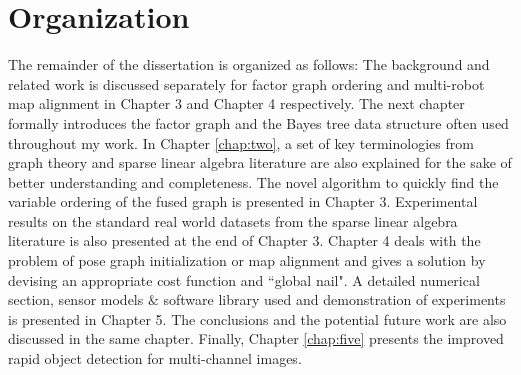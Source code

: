 \section{Organization}
The remainder of the dissertation is organized as follows: The background and related work is discussed separately for factor graph ordering and multi-robot map alignment in Chapter 3 and Chapter 4 respectively. The next chapter formally introduces the factor graph and the Bayes tree data structure often used throughout my work. In Chapter \ref{chap:two}, a set of key terminologies from graph theory and sparse linear algebra literature are also explained for the sake of better understanding and completeness. The novel algorithm to quickly find the variable ordering of the fused graph is presented in Chapter 3. Experimental results on the standard real world datasets from the sparse linear algebra literature is also presented at the end of Chapter 3. Chapter 4 deals with the problem of pose graph initialization or map alignment and gives a solution by devising an appropriate cost function and ``global nail". A detailed numerical section, sensor models $\&$ software library used and demonstration of experiments is presented in Chapter 5. The conclusions and the potential future work are also discussed in the same chapter. Finally, Chapter \ref{chap:five} presents the improved rapid object detection for multi-channel images.





